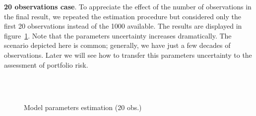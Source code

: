\documentclass[11pt,fleqn]{book} %
\begin{document}
\begin{example}
	\textbf{20 observations case}. To appreciate the effect of the number of 
	observations in the final result, we repeated the estimation procedure 
	but considered only the first 20 observations instead of the 1000 
	available. The results are displayed in figure~\ref{fig:calib3}. Note 
	that the parameters uncertainty increases dramatically. The scenario 
	depicted here is common; generally, we have just a few decades of 
	observations. Later we will see how to transfer this parameters 
	uncertainty to the assessment of portfolio risk.
	\begin{figure}[!ht]
		\centering
		\hfill
		\\
		\\
		\caption{Model parameters estimation (20 obs.)}
		\label{fig:calib3}
	\end{figure}

\end{example}
\end{document}
